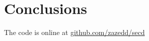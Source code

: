 \section{Conclusions}
The code is online at \href{https://github.com/zazedd/secd}{github.com/zazedd/secd}
